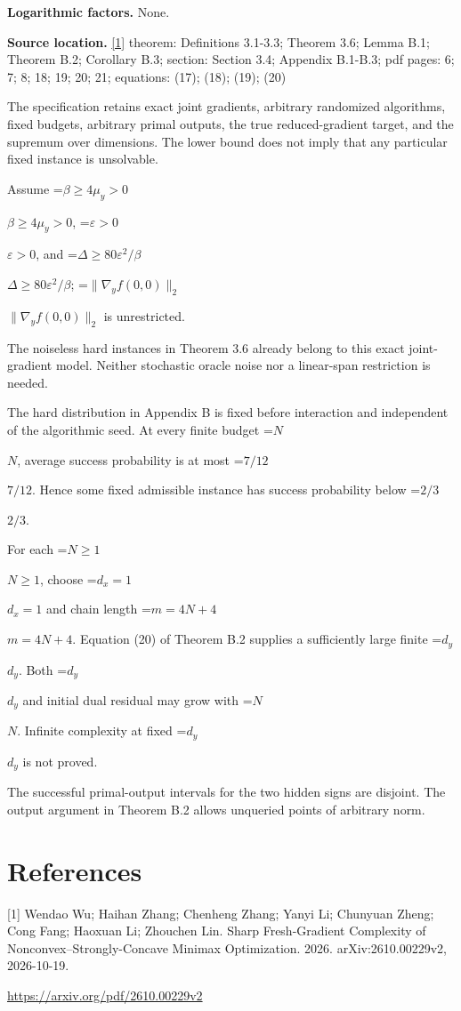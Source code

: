 \documentclass[10pt,a4paper]{article}
\newcommand{\AtlasMath}[1]{\par\begingroup\centering\setbox0=\hbox{$\displaystyle #1$}\ifdim\wd0>1.4\linewidth\typeout{ATLAS WIDE FORMULA: \the\wd0}\fi\ifdim\wd0>\linewidth\resizebox{\linewidth}{!}{\box0}\else\box0\fi\par\endgroup}
\newcommand{\AtlasInlineMath}[1]{\begingroup\setbox0=\hbox{$#1$}\ifdim\wd0>.4\linewidth\endgroup\AtlasMath{#1}\else\endgroup$#1$\fi}
\begin{document}
\textbf{Logarithmic factors.} None.

\textbf{Source location.} \href{https://arxiv.org/pdf/2610.00229v2}{[1]} theorem: Definitions 3.1-3.3; Theorem 3.6; Lemma B.1; Theorem B.2; Corollary B.3; section: Section 3.4; Appendix B.1-B.3; pdf pages: 6; 7; 8; 18; 19; 20; 21; equations: (17); (18); (19); (20)

The specification retains exact joint gradients, arbitrary randomized algorithms, fixed budgets, arbitrary primal outputs, the true reduced-gradient target, and the supremum over dimensions. The lower bound does not imply that any particular fixed instance is unsolvable.

Assume \AtlasInlineMath{\beta\ge4\mu_y>0}, \AtlasInlineMath{\varepsilon>0}, and \AtlasInlineMath{\Delta\ge80\varepsilon^2/\beta}; \AtlasInlineMath{\|\nabla_yf(0,0)\|_2} is unrestricted.

The noiseless hard instances in Theorem 3.6 already belong to this exact joint-gradient model. Neither stochastic oracle noise nor a linear-span restriction is needed.

The hard distribution in Appendix B is fixed before interaction and independent of the algorithmic seed. At every finite budget \AtlasInlineMath{N}, average success probability is at most \AtlasInlineMath{7/12}. Hence some fixed admissible instance has success probability below \AtlasInlineMath{2/3}.

For each \AtlasInlineMath{N\ge1}, choose \AtlasInlineMath{d_x=1} and chain length \AtlasInlineMath{m=4N+4}. Equation (20) of Theorem B.2 supplies a sufficiently large finite \AtlasInlineMath{d_y}. Both \AtlasInlineMath{d_y} and initial dual residual may grow with \AtlasInlineMath{N}. Infinite complexity at fixed \AtlasInlineMath{d_y} is not proved.

The successful primal-output intervals for the two hidden signs are disjoint. The output argument in Theorem B.2 allows unqueried points of arbitrary norm.

\section{References}
[1] Wendao Wu; Haihan Zhang; Chenheng Zhang; Yanyi Li; Chunyuan Zheng; Cong Fang; Haoxuan Li; Zhouchen Lin. Sharp Fresh-Gradient Complexity of Nonconvex--Strongly-Concave Minimax Optimization. 2026. arXiv:2610.00229v2, 2026-10-19.

\url{https://arxiv.org/pdf/2610.00229v2}
\end{document}
